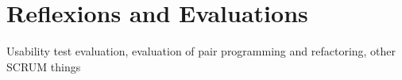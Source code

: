 \chapter{Reflexions and Evaluations}
Usability test evaluation, evaluation of pair programming and refactoring, other SCRUM things